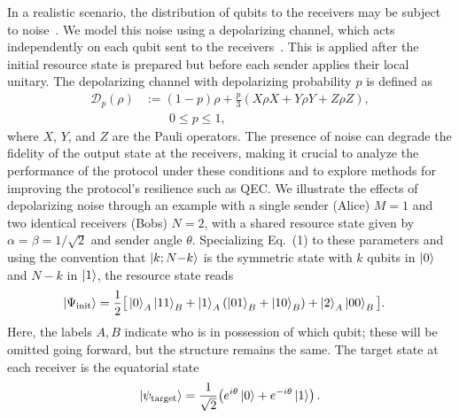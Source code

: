 In a realistic scenario, the distribution of qubits to the receivers may be subject to noise~\cite{schumacher1996sending, bergou2013introduction}. We model this noise using a depolarizing channel, which acts independently on each qubit sent to the receivers~\cite{dur2005standard}. This is applied after the initial resource state is prepared but before each sender applies their local unitary. The depolarizing channel with depolarizing probability $p$ is defined as
\begin{align}
\mathcal{D}_p(\rho)
&:= (1-p)\rho + \frac{p}{3}\left(X\rho X + Y\rho Y + Z\rho Z\right), \\
&\qquad 0\le p\le 1, \nonumber
\end{align}
where $X$, $Y$, and $Z$ are the Pauli operators. The presence of noise can degrade the fidelity of the output state at the receivers, making it crucial to analyze the performance of the protocol under these conditions and to explore methods for improving the protocol's resilience such as QEC.
%
We illustrate the effects of depolarizing noise through an example with a single sender (Alice) $M=1$ and two identical receivers (Bobs) $N=2$, with a shared resource state given by $\alpha=\beta=1/\sqrt{2}$ and sender angle $\theta$. Specializing Eq.~(1) to these parameters and using the convention that $\ket{k;N{-}k}$ is the symmetric state with $k$ qubits in $\ket{0}$ and $N{-}k$ in $\ket{1}$, the resource state reads
\begin{align}
    \ket{\Psi_{\text{init}}} = \frac{1}{2}\big[&\ket{0}_A\ket{11}_{B} + \ket{1}_A(\ket{01}_{B} + \ket{10}_{B}) + \ket{2}_A\ket{00}_{B}\big].
\end{align}
Here, the labels $A,B$ indicate who is in possession of which qubit; these will be omitted going forward, but the structure remains the same. The target state at each receiver is the equatorial state 
\begin{align}
    \ket{\psi_{\mathrm{target}}} = \frac{1}{\sqrt{2}}\!\left(e^{i\theta}\ket{0} + e^{-i\theta}\ket{1}\right).
\end{align}


